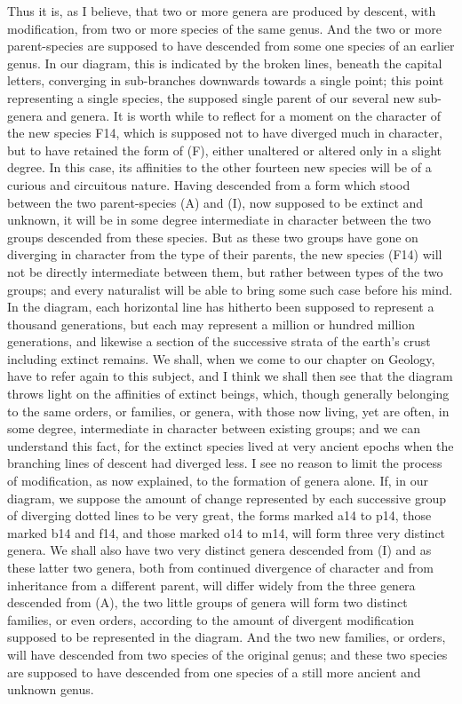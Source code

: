 Thus it is, as I believe, that two or more genera are produced by descent, with modification, from two or more species of the same genus. And the two or more parent-species are supposed to have descended from some one species of an earlier genus. In our diagram, this is indicated by the broken lines, beneath the capital letters, converging in sub-branches downwards towards a single point; this point representing a single species, the supposed single parent of our several new sub-genera and genera.
It is worth while to reflect for a moment on the character of the new species F14, which is supposed not to have diverged much in character, but to have retained the form of (F), either unaltered or altered only in a slight degree. In this case, its affinities to the other fourteen new species will be of a curious and circuitous nature. Having descended from a form which stood between the two parent-species (A) and (I), now supposed to be extinct and unknown, it will be in some degree intermediate in character between the two groups descended from these species. But as these two groups have gone on diverging in character from the type of their parents, the new species (F14) will not be directly intermediate between them, but rather between types of the two groups; and every naturalist will be able to bring some such case before his mind.
In the diagram, each horizontal line has hitherto been supposed to represent a thousand generations, but each may represent a million or hundred million generations, and likewise a section of the successive strata of the earth's crust including extinct remains. We shall, when we come to our chapter on Geology, have to refer again to this subject, and I think we shall then see that the diagram throws light on the affinities of extinct beings, which, though generally belonging to the same orders, or families, or genera, with those now living, yet are often, in some degree, intermediate in character between existing groups; and we can understand this fact, for the extinct species lived at very ancient epochs when the branching lines of descent had diverged less.
I see no reason to limit the process of modification, as now explained, to the formation of genera alone. If, in our diagram, we suppose the amount of change represented by each successive group of diverging dotted lines to be very great, the forms marked a14 to p14, those marked b14 and f14, and those marked o14 to m14, will form three very distinct genera. We shall also have two very distinct genera descended from (I) and as these latter two genera, both from continued divergence of character and from inheritance from a different parent, will differ widely from the three genera descended from (A), the two little groups of genera will form two distinct families, or even orders, according to the amount of divergent modification supposed to be represented in the diagram. And the two new families, or orders, will have descended from two species of the original genus; and these two species are supposed to have descended from one species of a still more ancient and unknown genus.
